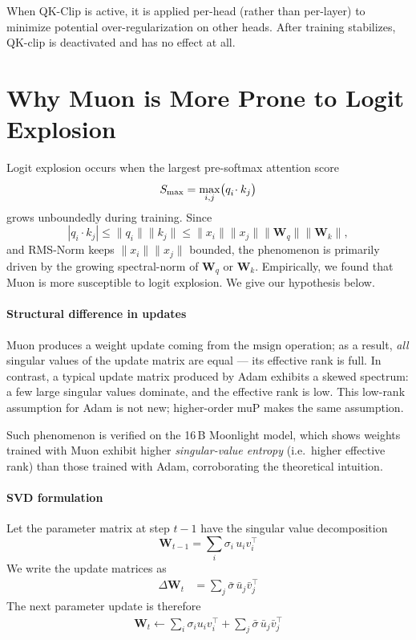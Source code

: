 When QK-Clip is active, it is applied per-head (rather
than per-layer) to minimize potential over-regularization on other heads.
After training stabilizes, QK-clip is deactivated and has no effect at all.


\section{Why Muon is More Prone to Logit Explosion}

Logit explosion occurs when the largest pre-softmax attention score
\begin{equation}
S_{\max} = \max_{i,j} \bigl(q_i^{\vphantom{\top}}\! \cdot k_j\bigr)
\end{equation}
grows unboundedly during training.  Since
\begin{equation}
|q_i \!\cdot\! k_j| \le \|q_i\|\|k_j\| \le \|x_i\|\|x_j\|\|\mathbf W_q\|\|\mathbf W_k\|,
\end{equation}
and RMS-Norm keeps $\|x_i\|\|x_j\|$ bounded, the phenomenon is primarily driven by the growing spectral-norm of $\mathbf W_q$ or $\mathbf W_k$.  Empirically, we found that Muon is more susceptible to logit explosion. We give our hypothesis below.

\paragraph{Structural difference in updates}
Muon produces a weight update coming from the $\mathrm{msign}$ operation; as a result, \emph{all} singular values of the update matrix are equal --- its effective rank is full.  
In contrast, a typical update matrix produced by Adam exhibits a skewed spectrum: a few large singular values dominate, and the effective rank is low.  This low-rank assumption for Adam is not new; higher-order muP makes the same assumption.

Such phenomenon is verified on the 16\,B Moonlight model, which shows weights trained with Muon exhibit higher \emph{singular-value entropy} (i.e.\ higher effective rank) than those trained with Adam, corroborating the theoretical intuition.

\paragraph{SVD formulation}  
Let the parameter matrix at step $t-1$ have the singular value decomposition
\begin{equation}
\mathbf W_{t-1}=\sum_i \sigma_i\,u_i v_i^{\top}
\end{equation}
We write the update matrices as
\begin{align}
\Delta\mathbf W_t &= \sum_j \bar\sigma\,\bar u_j \bar v_j^{\top}
\end{align}  
The next parameter update is therefore
\begin{align}
\mathbf W_t \leftarrow \sum_i \sigma_i u_i v_i^{\top} + \sum_j \bar\sigma\,\bar u_j \bar v_j^{\top}
\end{align}

